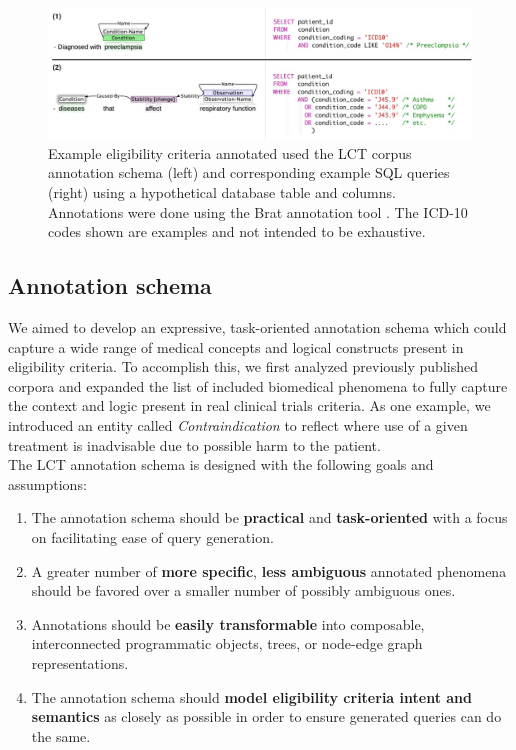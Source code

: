 \documentclass[../main.tex]{subfiles}
\begin{document}
\begin{figure}[t]
  \includegraphics[scale=0.57]{figs/lct_text2sql.pdf}  
\caption{Example eligibility criteria annotated used the LCT corpus annotation schema (left) and corresponding example SQL queries (right) using a hypothetical database table and columns. Annotations were done using the Brat annotation tool \cite{stenetorp2012brat}. The ICD-10 codes shown are examples and not intended to be exhaustive.}
\label{fig_lct_text2sql}
\end{figure}

\subsection*{Annotation schema}

\noindent We aimed to develop an expressive, task-oriented annotation schema which could capture a wide range of medical concepts and logical constructs present in eligibility criteria. To accomplish this, we first analyzed previously published corpora \cite{weng2011elixr,boland2012elixrtime,kang2017eliie,kury2020chia} and expanded the list of included biomedical phenomena to fully capture the context and logic present in real clinical trials criteria. As one example, we introduced an entity called \textit{Contraindication} to reflect where use of a given treatment is inadvisable due to possible harm to the patient. \\

\noindent The LCT annotation schema is designed with the following goals and assumptions:

\begin{enumerate}
    \item The annotation schema should be \textbf{practical} and  \textbf{task-oriented} with a focus on facilitating ease of query generation. 
    \item A greater number of \textbf{more specific}, \textbf{less ambiguous} annotated phenomena should be favored over a smaller number of possibly ambiguous ones.
    \item Annotations should be \textbf{easily transformable} into composable, interconnected programmatic objects, trees, or node-edge graph representations.
    \item The annotation schema should \textbf{model eligibility criteria intent and semantics} as closely as possible in order to ensure generated queries can do the same.
\end{enumerate}
\end{document}
